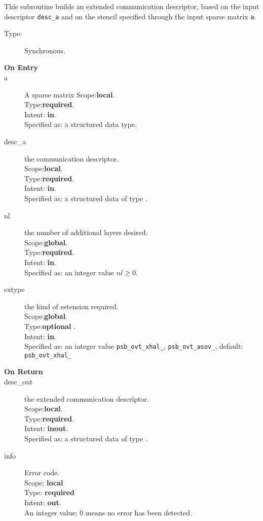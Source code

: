 This subroutine builds an extended communication descriptor, based on
the input descriptor \verb|desc_a| and on the stencil specified
through the input sparse matrix \verb|a|. 
\begin{description}
\item[Type:] Synchronous.
\item[\bf On Entry]
\item[a] A sparse matrix
Scope:{\bf local}.\\
Type:{\bf required}.\\
Intent: {\bf in}.\\
Specified as: a structured data type.
\item[desc\_a] the communication descriptor.\\
Scope:{\bf local}.\\
Type:{\bf required}.\\
Intent: {\bf in}.\\
Specified as: a structured data of type \spdata.
\item[nl] the number of additional layers desired.\\
Scope:{\bf global}.\\
Type:{\bf required}.\\
Intent: {\bf in}.\\
Specified as: an integer value $nl\ge 0$. 
\item[extype] the kind of estension required.\\
Scope:{\bf global}.\\
Type:{\bf optional }.\\
Intent: {\bf in}.\\
Specified as: an integer value
\verb|psb_ovt_xhal_|, \verb|psb_ovt_asov_|, default: \verb|psb_ovt_xhal_|

\end{description}

\begin{description}
\item[\bf On Return]
\item[desc\_out] the extended communication descriptor.\\
Scope:{\bf local}.\\
Type:{\bf required}.\\
Intent: {\bf inout}.\\
Specified as: a structured data of type \descdata.
\item[info] Error code.\\
Scope: {\bf local} \\
Type: {\bf required} \\
Intent: {\bf out}.\\
An integer value; 0 means no error has been detected. 
\end{description}

